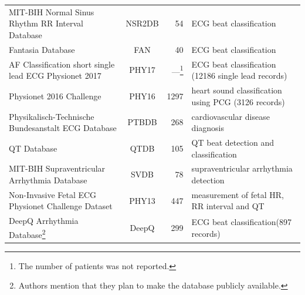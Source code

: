 \documentclass[journal]{IEEEtran}
\begin{document}
\begin{table}[!t]
\begin{minipage}{\textwidth}
\begin{tabularx}{\textwidth}{l c r l}
			MIT-BIH Normal Sinus Rhythm RR Interval Database\cite{goldsmith1992comparison}                & NSR2DB          & 54                                                                                & ECG beat classification                                      \\
			Fantasia Database\cite{iyengar1996age}                                                        & FAN             & 40                                                                                & ECG beat classification                                      \\
			AF Classification short single lead ECG Physionet 2017\cite{moody2001impact}                  & PHY17           & ---\footnote{\label{publicdatabaselabel}The number of patients was not reported.} & ECG beat classification (12186 single lead records)          \\
			Physionet 2016 Challenge\cite{liu2016open}                                                    & PHY16           & 1297                                                                              & heart sound classification using PCG (3126 records)          \\
			Physikalisch-Technische Bundesanstalt ECG Database\cite{bousseljot1995nutzung}                & PTBDB           & 268                                                                               & cardiovascular disease diagnosis                             \\
			QT Database\cite{laguna1997database}                                                          & QTDB            & 105                                                                               & QT beat detection and classification                         \\
			MIT-BIH Supraventricular Arrhythmia Database\cite{greenwald1990improved}                      & SVDB            & 78                                                                                & supraventricular arrhythmia detection                        \\
			Non-Invasive Fetal ECG Physionet Challenge Dataset\cite{silva2013noninvasive}                 & PHY13           & 447                                                                               & measurement of fetal HR, RR interval and QT                  \\
			DeepQ Arrhythmia Database\cite{wu2017deepq}\footnote{Authors mention that they plan to make the database publicly available.}                 & DeepQ           & 299                                                                               & ECG beat classification(897 records)                 \\

\end{tabularx}
\end{minipage}
\end{table}
\end{document}
